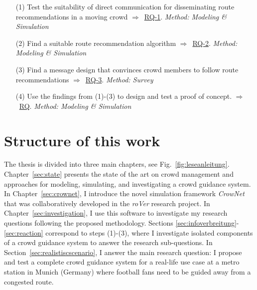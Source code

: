 \begin{tcolorbox}[title=Proposed methodology for designing a guidance system]
\begin{itemize}
\item[(1)] Test the suitability of direct communication for disseminating route recommendations in a moving crowd $\Rightarrow$~\hyperref[reserachquestions]{RQ-1}. \textit{Method: Modeling \& Simulation}
\item[(2)] Find a suitable route recommendation algorithm $\Rightarrow$~\hyperref[reserachquestions]{RQ-2}. \textit{Method: Modeling \& Simulation}
\item[(3)] Find a message design that convinces crowd members to follow route recommendations $\Rightarrow$~\hyperref[reserachquestions]{RQ-3}.   \textit{Method: Survey}
\item[(4)] Use the findings from (1)-(3) to design and test a proof of concept. $\Rightarrow$~\hyperref[reserachquestions]{RQ}. \textit{Method: Modeling \& Simulation}
\end{itemize}
\end{tcolorbox}

\vspace{0.5cm}




\section{Structure of this work}

The thesis is divided into three main chapters, see Fig.~\ref{fig:leseanleitung}.
Chapter~\ref{sec:state} presents the state of the art on crowd management and approaches for modeling, simulating, and investigating a crowd guidance system. In Chapter~\ref{sec:crownet}, I introduce the novel simulation framework \textit{CrowNet} that was collaboratively developed in the \textit{roVer} research project.
In Chapter~\ref{sec:investigation}, I use this software to investigate my research questions following the proposed methodology. Sections \ref{sec:infoverbreitung}-\ref{sec:reaction} correspond to steps (1)-(3), where I investigate isolated components of a crowd guidance system to answer the research sub-questions. In Section~\ref{sec:realistiscscenario}, I answer the main research question: I propose and test a complete crowd guidance system for a real-life use case at a metro station in Munich (Germany) where football fans need to be guided away from a congested route.


